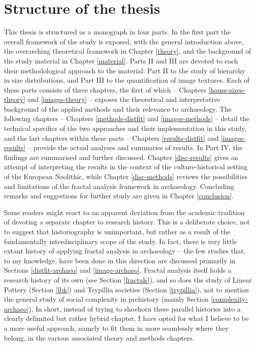 \documentclass[
  12pt,
  a4paper, twoside]{book}
\begin{document}
\hypertarget{structure-of-the-thesis}{%
\section{Structure of the thesis}\label{structure-of-the-thesis}}

This thesis is structured as a monograph in four parts. In the first part the overall framework of the study is exposed, with the general introduction above, the overarching theoretical framework in Chapter \ref{theory}, and the background of the study material in Chapter \ref{material}. Parts II and III are devoted to each their methodological approach to the material: Part II to the study of hierarchy in size distributions, and Part III to the quantification of image textures. Each of these parts consists of three chapters, the first of which -- Chapters \ref{house-sizes-theory} and \ref{images-theory} -- exposes the theoretical and interpretative background of the applied methods and their relevance to archaeology. The following chapters -- Chapters \ref{methods-distfit} and \ref{images-methods} -- detail the technical specifics of the two approaches and their implementation in this study, and the last chapters within these parts -- Chapters \ref{results-distfit} and \ref{images-results} -- provide the actual analyses and summaries of results. In Part IV, the findings are summarised and further discussed. Chapter \ref{disc-results} gives an attempt of interpreting the results in the context of the culture-historical setting of the European Neolithic, while Chapter \ref{disc-methods} reviews the possibilities and limitations of the fractal analysis framework in archaeology. Concluding remarks and suggestions for further study are given in Chapter \ref{conclusion}.

Some readers might react to an apparent deviation from the academic tradition of devoting a separate chapter to research history. This is a deliberate choice, not to suggest that historiography is unimportant, but rather as a result of the fundamentally interdisciplinary scope of the study. In fact, there is very little extant history of applying fractal analysis in archaeology -- the few studies that, to my knowledge, have been done in this direction are discussed primarily in Sections \ref{distfit-archaeo} and \ref{image-archaeo}. Fractal analysis itself holds a research history of its own (see Section \ref{fractals}), and so does the study of Linear Pottery (Section \ref{lbk}) and Trypillia societies (Section \ref{trypillia}), not to mention the general study of social complexity in prehistory (mainly Section \ref{complexity-archaeo}). In short, instead of trying to shoehorn these parallel histories into a clearly delimited but rather hybrid chapter, I have opted for what I believe to be a more useful approach, namely to fit them in more seamlessly where they belong, in the various associated theory and methods chapters.
\end{document}
